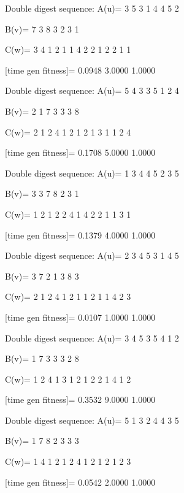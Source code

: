 Double digest sequence:
A(u)=
     3     5     3     1     4     4     5     2

B(v)=
     7     3     8     3     2     3     1

C(w)=
     3     4     1     2     1     1     4     2     2     1     2     2     1     1

[time gen fitness]=
    0.0948    3.0000    1.0000

Double digest sequence:
A(u)=
     5     4     3     3     5     1     2     4

B(v)=
     2     1     7     3     3     3     8

C(w)=
     2     1     2     4     1     2     1     2     1     3     1     1     2     4

[time gen fitness]=
    0.1708    5.0000    1.0000

Double digest sequence:
A(u)=
     1     3     4     4     5     2     3     5

B(v)=
     3     3     7     8     2     3     1

C(w)=
     1     2     1     2     2     4     1     4     2     2     1     1     3     1

[time gen fitness]=
    0.1379    4.0000    1.0000

Double digest sequence:
A(u)=
     2     3     4     5     3     1     4     5

B(v)=
     3     7     2     1     3     8     3

C(w)=
     2     1     2     4     1     2     1     1     2     1     1     4     2     3

[time gen fitness]=
    0.0107    1.0000    1.0000

Double digest sequence:
A(u)=
     3     4     5     3     5     4     1     2

B(v)=
     1     7     3     3     3     2     8

C(w)=
     1     2     4     1     3     1     2     1     2     2     1     4     1     2

[time gen fitness]=
    0.3532    9.0000    1.0000

Double digest sequence:
A(u)=
     5     1     3     2     4     4     3     5

B(v)=
     1     7     8     2     3     3     3

C(w)=
     1     4     1     2     1     2     4     1     2     1     2     1     2     3

[time gen fitness]=
    0.0542    2.0000    1.0000

